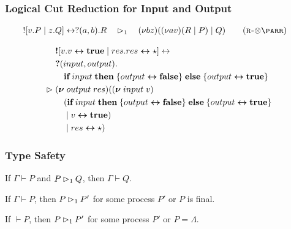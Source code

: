 \documentclass[11pt, aspectratio=169, xcolor={dvipsnames}, usepdftitle=false]{beamer}
\begin{document}
\begin{frame}
  \frametitle{Logical Cut Reduction for Input and Output}
  \vspace{-2em}
  \begin{align}
    \link{\ssend{v.P}{z.Q}}{\sreceive{a}{b}{R}}
    &\quad\contr\quad \parcomp{b}{z}{\parcomp{a}{v}{R}{P}}{Q}
    \tag{\textsc{r-$\otimes\parr$}}
  \end{align}

  \begin{example}
    \vspace{-2em}
    \begin{align*}
           &\; \textbf{!} [v . v \boldsymbol{\leftrightarrow} \textbf{true} \mid res . res \boldsymbol{\leftrightarrow} \star] \leftrightarrow \\
           &\; \textbf{?}(input, output). \\
           &\; \quad \textbf{if} \; input \; \textbf{then} \; \{output \boldsymbol{\leftrightarrow} \textbf{false}\} \; \textbf{else} \; \{output \boldsymbol{\leftrightarrow} \textbf{true}\} \\
      \rhd &\; (\boldsymbol{\nu} \; output \; res) ((\boldsymbol{\nu} \; input \; v) \\
           &\; \quad (\textbf{if} \; input \; \textbf{then} \; \{output \boldsymbol{\leftrightarrow} \textbf{false}\} \; \textbf{else} \; \{output \boldsymbol{\leftrightarrow} \textbf{true}\} \\
           &\; \quad \mid v \boldsymbol{\leftrightarrow} \textbf{true}) \\
           &\; \quad \mid res \boldsymbol{\leftrightarrow} \star) \\
    \end{align*}
    \vspace{-4em}
  \end{example}
\end{frame}

\begin{frame}
\end{frame}

\begin{frame}
  \frametitle{Type Safety}
  \begin{theorem}
    If $\Gamma \vdash P$ and $P \rhd_1 Q$, then $\Gamma \vdash Q$.
  \end{theorem}

  \begin{theorem}
    If $\Gamma \vdash P$, then $P \rhd_1 P'$ for some process $P'$ or
    $P$ is final.
  \end{theorem}

  \begin{corollary}
    If $\vdash P$, then $P \rhd_1 P'$ for some process $P'$ or
    $P = \Lambda$.
  \end{corollary}

\end{frame}
\end{document}
